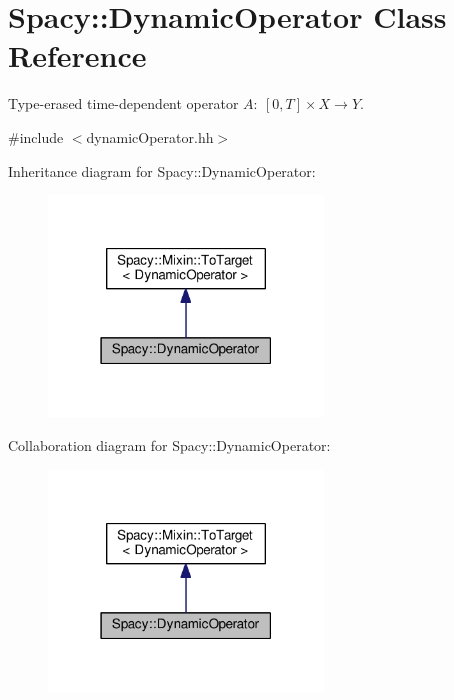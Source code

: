 \hypertarget{classSpacy_1_1DynamicOperator}{}\section{Spacy\+:\+:Dynamic\+Operator Class Reference}
\label{classSpacy_1_1DynamicOperator}


Type-\/erased time-\/dependent operator $A:\ [0,T] \times X \to Y $.  




{\ttfamily \#include $<$dynamic\+Operator.\+hh$>$}



Inheritance diagram for Spacy\+:\+:Dynamic\+Operator\+:\nopagebreak
\begin{figure}[H]
\begin{center}
\leavevmode
\includegraphics[width=207pt]{classSpacy_1_1DynamicOperator__inherit__graph}
\end{center}
\end{figure}


Collaboration diagram for Spacy\+:\+:Dynamic\+Operator\+:\nopagebreak
\begin{figure}[H]
\begin{center}
\leavevmode
\includegraphics[width=207pt]{classSpacy_1_1DynamicOperator__coll__graph}
\end{center}
\end{figure}

